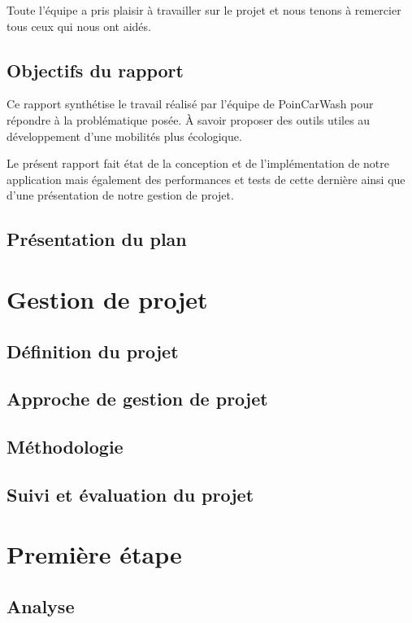 \documentclass[a4paper, 12pt]{report}
\begin{document}
Toute l'équipe a pris plaisir à travailler sur le projet et nous tenons à remercier tous ceux qui nous ont aidés.

    \section{Objectifs du rapport}

Ce rapport synthétise le travail réalisé par l'équipe de PoinCarWash pour répondre à la problématique posée. À savoir proposer des outils utiles au développement d'une mobilités plus écologique.
    
\bigskip
Le présent rapport fait état de la conception et de l'implémentation de notre application mais également des performances et tests de cette dernière ainsi que d'une présentation de notre gestion de projet.

    \section{Présentation du plan}
    


\chapter{Gestion de projet}
\minitoc
{}
\clearpage
    \section{Définition du projet}
    \section{Approche de gestion de projet}
    \section{Méthodologie}
    \section{Suivi et évaluation du projet}
    

\chapter{Première étape}
\minitoc
{}
\clearpage
    \section{Analyse}
\end{document}
